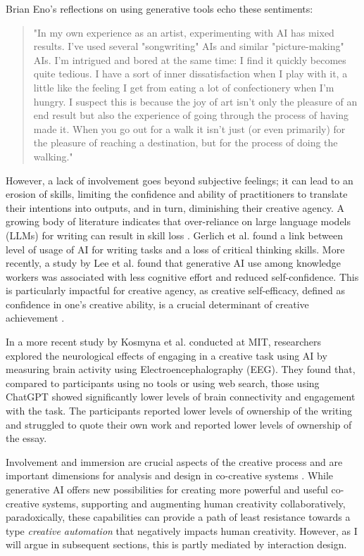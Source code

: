 Brian Eno's reflections on using generative tools echo these sentiments:

\begin{quote}
"In my own experience as an artist, experimenting with AI has mixed results. I've used several "songwriting" AIs and similar "picture-making" AIs. I'm intrigued and bored at the same time: I find it quickly becomes quite tedious. I have a sort of inner dissatisfaction when I play with it, a little like the feeling I get from eating a lot of confectionery when I'm hungry. I suspect this is because the joy of art isn't only the pleasure of an end result but also the experience of going through the process of having made it. When you go out for a walk it isn't just (or even primarily) for the pleasure of reaching a destination, but for the process of doing the walking." \cite{Eno2024-rj}
\end{quote}

However, a lack of involvement goes beyond subjective feelings; it can lead to an erosion of skills, limiting the confidence and ability of practitioners to translate their intentions into outputs, and in turn, diminishing their creative agency. A growing body of literature indicates that over-reliance on large language models (LLMs) for writing can result in skill loss \cite{Heersmink2024-mk, Rafner2021-tm}. Gerlich et al. \cite{Gerlich2025-as} found a link between level of usage of AI for writing tasks and a loss of critical thinking skills. More recently, a study by Lee et al. \cite{Lee2025-dw} found that generative AI use among knowledge workers was associated with less cognitive effort and reduced self-confidence. This is particularly impactful for creative agency, as creative self-efficacy, defined as confidence in one's creative ability, is a crucial determinant of creative achievement \cite{Tierney2002-xp}.

In a more recent study by Kosmyna et al. \cite{Kosmyna2025-cm} conducted at MIT, researchers explored the neurological effects of engaging in a creative task using AI by measuring brain activity using Electroencephalography (EEG). They found that, compared to participants using no tools or using web search, those using ChatGPT showed significantly lower levels of brain connectivity and engagement with the task. The participants reported lower levels of ownership of the writing and struggled to quote their own work and reported lower levels of ownership of the essay.

Involvement and immersion are crucial aspects of the creative process \cite{Amabile1996-pt, Csikszentmihalyi1997-ui} and are important dimensions for analysis and design in co-creative systems \cite{Davis2016-te, Cherry2014-ty, Rezwana2022-ui, Clark2018-yf, Lawton2023-gd, Yuan2022-kb, Li2024-yh, Kantosalo2015-pk, Resnick2005-fs}. While generative AI offers new possibilities for creating more powerful and useful co-creative systems, supporting and augmenting human creativity collaboratively, paradoxically, these capabilities can provide a path of least resistance towards a type \textit{creative automation} that negatively impacts human creativity. However, as I will argue in subsequent sections, this is partly mediated by interaction design. 

